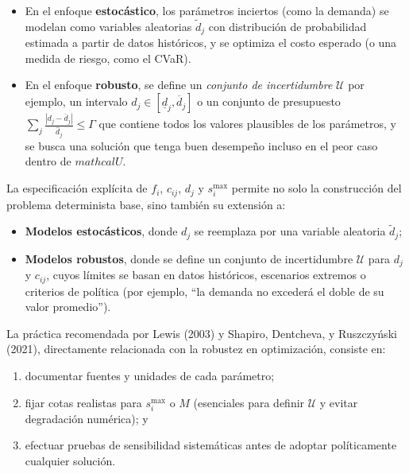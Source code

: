 \documentclass[
  spanish,
  us-letterpaper,
]{scrreprt}
\providecommand{\tightlist}{%
  \setlength{\itemsep}{0pt}\setlength{\parskip}{0pt}}
\numberwithin{equation}{section}
\begin{document}
\begin{itemize}
\tightlist
\item
  En el enfoque \textbf{estocástico}, los parámetros inciertos (como la
  demanda) se modelan como variables aleatorias \(\tilde d_j\) con
  distribución de probabilidad estimada a partir de datos históricos, y
  se optimiza el costo esperado (o una medida de riesgo, como el
  CVaR).\\
\item
  En el enfoque \textbf{robusto}, se define un \emph{conjunto de
  incertidumbre} \(\mathcal{U}\) por ejemplo, un intervalo
  \(d_j \in [\underline{d}_j, \overline{d}_j]\) o un conjunto de
  presupuesto \(\sum_j \frac{|d_j - \bar d_j|}{\hat d_j} \leq \Gamma\)
  que contiene todos los valores plausibles de los parámetros, y se
  busca una solución que tenga buen desempeño incluso en el peor caso
  dentro de \(mathcal{U}\).
\end{itemize}

La especificación explícita de \(f_i\), \(c_{ij}\), \(d_j\) y
\(s_i^{\max}\) permite no solo la construcción del problema determinista
base, sino también su extensión a:

\begin{itemize}
\tightlist
\item
  \textbf{Modelos estocásticos}, donde \(d_j\) se reemplaza por una
  variable aleatoria \(\tilde d_j\);\\
\item
  \textbf{Modelos robustos}, donde se define un conjunto de
  incertidumbre \(\mathcal{U}\) para \(d_j\) y \(c_{ij}\), cuyos límites
  se basan en datos históricos, escenarios extremos o criterios de
  política (por ejemplo, ``la demanda no excederá el doble de su valor
  promedio'').
\end{itemize}

La práctica recomendada por Lewis (2003) y Shapiro, Dentcheva, y
Ruszczyński (2021), directamente relacionada con la robustez en
optimización, consiste en:

\begin{enumerate}
\def\labelenumi{(\roman{enumi})}
\tightlist
\item
  documentar fuentes y unidades de cada parámetro;\\
\item
  fijar cotas realistas para \(s_i^{\max}\) o \(M\) (esenciales para
  definir \(\mathcal{U}\) y evitar degradación numérica); y\\
\item
  efectuar pruebas de sensibilidad sistemáticas antes de adoptar
  políticamente cualquier solución.
\end{enumerate}
\end{document}
